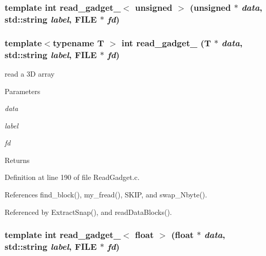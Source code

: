 \subsubsection[{read\_\-gadget\_\-1$<$ unsigned $>$}]{\setlength{\rightskip}{0pt plus 5cm}template int read\_\-gadget\_$<$ unsigned $>$ (unsigned $\ast$ {\em data}, \/  std::string {\em label}, \/  FILE $\ast$ {\em fd})}\label{ReadGadget_8c_a4b28139a89375c3cfd883bc092a94155}
\subsubsection[{read\_\-gadget\_\-3}]{\setlength{\rightskip}{0pt plus 5cm}template$<$typename T $>$ int read\_\-gadget\_ (T $\ast$ {\em data}, \/  std::string {\em label}, \/  FILE $\ast$ {\em fd})}\label{ReadGadget_8c_ad94fb9be5ec96b09a94fa083db81463c}
read a 3D array 
\begin{DoxyParams}{Parameters}
\item[{\em data}]\item[{\em label}]\item[{\em fd}]\end{DoxyParams}
\begin{DoxyReturn}{Returns}

\end{DoxyReturn}


Definition at line 190 of file ReadGadget.c.



References find\_\-block(), my\_\-fread(), SKIP, and swap\_\-Nbyte().



Referenced by ExtractSnap(), and readDataBlocks().

\subsubsection[{read\_\-gadget\_\-3$<$ float $>$}]{\setlength{\rightskip}{0pt plus 5cm}template int read\_\-gadget\_$<$ float $>$ (float $\ast$ {\em data}, \/  std::string {\em label}, \/  FILE $\ast$ {\em fd})}\label{ReadGadget_8c_a6f380edaefe7fe279c4e23234e0ec413}
